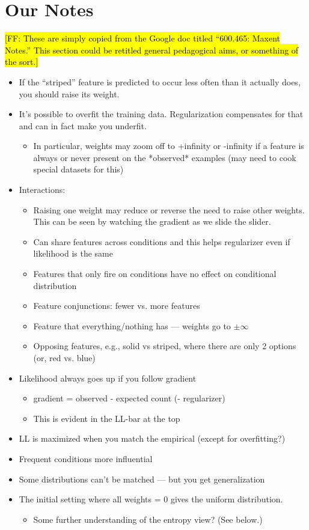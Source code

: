 \documentclass[11pt,letterpaper]{article}
\newcommand{\Note}[1]{}
\renewcommand{\Note}[1]{\hl{[#1]}}
\newcommand{\NoteSigned}[3]{{\sethlcolor{#2}\Note{#1: #3}}}
\newcommand{\NoteFF}[1]{\NoteSigned{FF}{LightBlue}{#1}}
\begin{document}
\section{Our Notes}
\NoteFF{These are simply copied from the Google doc titled ``600.465: Maxent Notes.'' This section could be retitled general pedagogical aims, or something of the sort.}
\begin{itemize}
\item If the “striped” feature is predicted to occur less often than it actually does, you should raise its weight.
\item It’s possible to overfit the training data.  Regularization compensates for that and can in fact make you underfit.
\begin{itemize}
\item In particular, weights may zoom off to +infinity or -infinity if a feature is always or never present on the *observed* examples (may need to cook special datasets for this)
\end{itemize}
\item Interactions:
\begin{itemize} 
\item Raising one weight may reduce or reverse the need to raise other weights.  This can be seen by watching the gradient as we slide the slider.
\item Can share features across conditions and this helps regularizer even if likelihood is the same
\item Features that only fire on conditions have no effect on conditional distribution
\item Feature conjunctions: fewer vs. more features
\item Feature that everything/nothing has --- weights go to $\pm \infty$
\item Opposing features, e.g., solid vs striped, where there are only 2 options (or, red vs. blue)
\end{itemize}
\item Likelihood always goes up if you follow gradient
\begin{itemize}
\item gradient = observed - expected count (- regularizer)
\item This is evident in the LL-bar at the top
\end{itemize}
\item LL is maximized when you match the empirical (except for overfitting?)
\item Frequent conditions more influential
\item Some distributions can't be matched --- but you get generalization
\item The initial setting where all weights = 0 gives the uniform distribution.
\begin{itemize}
\item Some further understanding of the entropy view?  (See below.)
\end{itemize}
\end{itemize}
\end{document}
